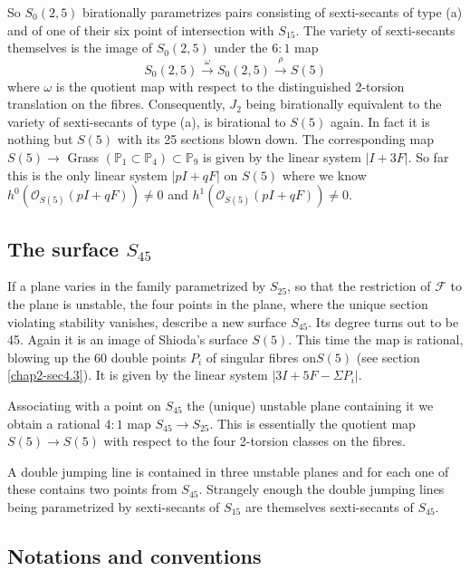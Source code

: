 So $S_{0}(2,5)$ birationally parametrizes pairs consisting of
sexti-secants of type (a) and of one of their six point of
intersection with $S_{15}$. The variety of sexti-secants themselves is
the image of $S_{0}(2,5)$ under the $6:1$ map
$$
S_{0}(2,5)\xrightarrow{\omega}S_{0}(2,5)\xrightarrow{\rho}S(5)
$$
where $\omega$ is the quotient map with respect to the distinguished
2-torsion translation on the fibres. Consequently, $J_{2}$ being
birationally equivalent to the variety of sexti-secants of type (a),
is birational to $S(5)$ again. In fact it is nothing but $S(5)$ with
its 25 sections blown down. The corresponding map $S(5)\to$ Grass
$(\mathbb{P}_{1}\subset \mathbb{P}_{4})\subset \mathbb{P}_{9}$ is
given by the linear system $|I+3F|$. So far this is the only linear
system $|pI+qF|$ on $S(5)$ where we know
$h^{0}(\mathscr{O}_{S(5)}(pI+qF))\neq 0$ and
$h^{1}(\mathscr{O}_{S(5)}(pI+qF))\neq 0$.

\subsection{The surface \texorpdfstring{\boldmath$S_{45}$}{S45}}\label{chap2-sec1.4}

If a plane varies in the family parametrized by $S_{25}$, so that the
restriction of $\mathscr{F}$ to the plane is unstable, the four points
in the plane, where the unique section violating stability vanishes,
describe a new surface $S_{45}$. Its degree turns out to be 45. Again
it is an image of Shioda's surface $S(5)$. This time the map is
rational, blowing up the 60 double points $P_{i}$ of singular fibres
on\pageoriginale $S(5)$ (see section \ref{chap2-sec4.3}). It is given
by the linear system $|3I+5F-\Sigma P_{i}|$.

Associating with a point on $S_{45}$ the (unique) unstable plane
containing it we obtain a rational $4:1$ map $S_{45}\to S_{25}$. This
is essentially the quotient map $S(5)\to S(5)$ with respect to the
four 2-torsion classes on the fibres.

A double jumping line is contained in three unstable planes and for
each one of these contains two points from $S_{45}$. Strangely enough
the double jumping lines being parametrized by sexti-secants of
$S_{15}$ are themselves sexti-secants of $S_{45}$.

\subsection{Notations and conventions}\label{chap2-sec1.5}

